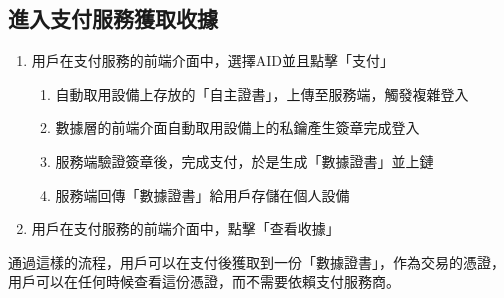 \subsection{進入支付服務獲取收據}
\begin{enumerate}
  \item 用戶在支付服務的前端介面中，選擇AID並且點擊「支付」
  \begin{enumerate}
    \item 自動取用設備上存放的「自主證書」，上傳至服務端，觸發複雜登入
    \item 數據層的前端介面自動取用設備上的私鑰產生簽章完成登入
    \item 服務端驗證簽章後，完成支付，於是生成「數據證書」並上鏈
    \item 服務端回傳「數據證書」給用戶存儲在個人設備
  \end{enumerate}
  \item 用戶在支付服務的前端介面中，點擊「查看收據」
\end{enumerate}
通過這樣的流程，用戶可以在支付後獲取到一份「數據證書」，作為交易的憑證，用戶可以在任何時候查看這份憑證，而不需要依賴支付服務商。
